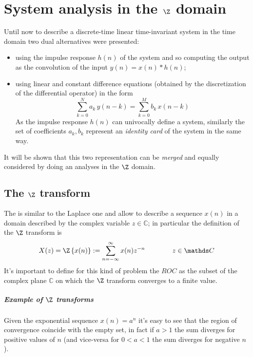 \chapter{System analysis in the $\Z$ domain}
	Until now to describe a discrete-time linear time-invariant system in the time domain two dual alternatives were presented:
	\begin{itemize}
		\item using the impulse response $h(n)$ of the system and so computing the output as the convolution of the input $y(n) = x(n) * h(n)$;
		\item using linear and constant difference equations (obtained by the discretization of the differential operator) in the form
		\[ \sum_{k=0}^N a_k \, y(n-k) = \sum_{k=0}^M b_k\, x(n-k) \]
		As the impulse response $h(n)$ can univocally define a system, similarly the set of coefficients $a_k,b_k$ represent an \textit{identity card} of the system in the same way.
	\end{itemize}
	
	It will be shown that this two representation can be \textit{merged} and equally considered by doing an analyses in the $\Z$ domain.
	
\section{The $\Z$ transform}
	The  is similar to the Laplace one and allow to describe a sequence $x(n)$ in a domain described by the complex variable $z\in \mathds C$; in particular the definition of the $\Z$ transform is
	\begin{equation}
		X(z) = \Z\left\{ x(n) \right\} : = \sum_{n=-\infty}^\infty x(n) z^{-n} \qquad \qquad z \in \mathds C
	\end{equation}
	It's important to define for this kind of problem the  $ROC$ as the subset of the complex plane $\mathds C$ on which the $\Z$ transform converges to a finite value.
	
	\paragraph{Example of $\Z$ transforms} Given the exponential sequence $x(n) = a^n$ it's easy to see that the region of convergence coincide with the empty set, in fact if $a>1$ the sum diverges for positive values of $n$ (and vice-versa for $0<a<1$ the sum diverges for negative $n$).
	

